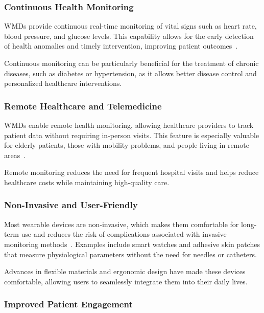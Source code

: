 \documentclass[journal]{IEEEtran}
\begin{document}
        \subsubsection{Continuous Health Monitoring}

        WMDs provide continuous real-time monitoring of vital signs such as heart rate, blood pressure, and glucose levels. This capability allows for the early detection of health anomalies and timely intervention, improving patient outcomes~\cite{Dias2018}.

        Continuous monitoring can be particularly beneficial for the treatment of chronic diseases, such as diabetes or hypertension, as it allows better disease control and personalized healthcare interventions.

        \subsubsection{Remote Healthcare and Telemedicine}

        WMDs enable remote health monitoring, allowing healthcare providers to track patient data without requiring in-person visits. This feature is especially valuable for elderly patients, those with mobility problems, and people living in remote areas~\cite{Nahavandi2022}.

        Remote monitoring reduces the need for frequent hospital visits and helps reduce healthcare costs while maintaining high-quality care.

        \subsubsection{Non-Invasive and User-Friendly}

        Most wearable devices are non-invasive, which makes them comfortable for long-term use and reduces the risk of complications associated with invasive monitoring methods~\cite{Iqbal2016}. Examples include smart watches and adhesive skin patches that measure physiological parameters without the need for needles or catheters.

        Advances in flexible materials and ergonomic design have made these devices comfortable, allowing users to seamlessly integrate them into their daily lives.

        \subsubsection{Improved Patient Engagement}
\end{document}
